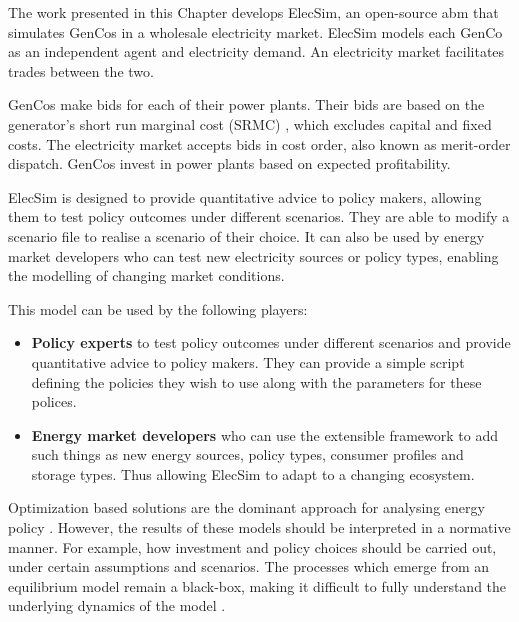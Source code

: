 The work presented in this Chapter develops ElecSim, an open-source \acrshort{abm} that simulates GenCos in a wholesale electricity market. ElecSim models each GenCo as an independent agent and electricity demand. An electricity market facilitates trades between the two. 

GenCos make bids for each of their power plants. Their bids are based on the generator's short run marginal cost (SRMC) \cite{Perloff2012}, which excludes capital and fixed costs. The electricity market accepts bids in cost order, also known as merit-order dispatch. GenCos invest in power plants based on expected profitability.	

ElecSim is designed to provide quantitative advice to policy makers, allowing them to test policy outcomes under different scenarios. They are able to modify a scenario file to realise a scenario of their choice. It can also be used by energy market developers who can test new electricity sources or policy types, enabling the modelling of changing market conditions.

 This model can be used by the following players:
 
 \begin{itemize}
 \item {\bf Policy experts} to test policy outcomes under different scenarios and provide quantitative advice to policy makers. They can provide a simple script defining the policies they wish to use along with the parameters for these polices.
 \item {\bf Energy market developers} who can use the extensible framework to add such things as new energy sources, policy types, consumer profiles and storage types. Thus allowing ElecSim to adapt to a changing ecosystem.
 \end{itemize}
 





Optimization based solutions are the dominant approach for analysing energy policy \cite{Chappin2017}. However, the results of these models should be interpreted in a normative manner. For example, how investment and policy choices should be carried out, under certain assumptions and scenarios. The processes which emerge from an equilibrium model remain a black-box, making it difficult to fully understand the underlying dynamics of the model \cite{Chappin2017}. 



